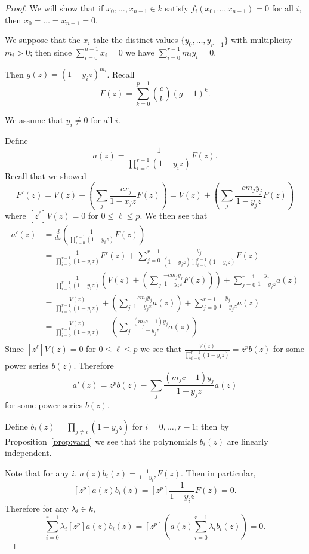 \documentclass{amsart}
\numberwithin{equation}{section}
\theoremstyle{definition}
\begin{document}
\begin{proof} 

We will show that if $x_0,\dots,x_{n-1} \in k$ satisfy $f_i(x_0,\dots,x_{n-1})=0$ for all $i$, then $x_0=\dots=x_{n-1}=0$. 



We suppose that the $x_i$ take the distinct values $\{y_0,\dots,y_{r-1}\}$ with multiplicity $m_i>0$; then since $\sum_{i=0}^{n-1} x_i=0$ we have $\sum_{i=0}^{r-1} m_iy_i=0$. 

Then $g(z)=(1-y_iz)^{m_i}$. Recall $$F(z)=\sum_{k=0}^{p-1} \binom{c}{k}(g-1)^k.$$

We assume that $y_i \ne 0$ for all $i$.

Define $$a(z)=\frac{1}{\prod_{i=0}^{r-1}(1-y_iz)}F(z).$$ Recall that we showed $$F'(z)=V(z)+\left(\sum_j \frac{-cx_j}{1-x_jz}F(z)\right)=V(z)+\left(\sum_j \frac{-cm_jy_j}{1-y_jz}F(z)\right)$$ where $[z^\ell]V(z)=0$ for $0 \le \ell \le p$. We then see that
\begin{align*}
a'(z)&=\frac{d}{dz}\left(\frac{1}{\prod_{i=0}^{r-1}(1-y_iz)}F(z)\right)\\
&=\frac{1}{\prod_{i=0}^{r-1}(1-y_iz)}F'(z)+\sum_{j=0}^{r-1}\frac{y_j}{(1-y_jz)\prod_{i=0}^{r-1}(1-y_iz)}F(z)\\
&=\frac{1}{\prod_{i=0}^{r-1}(1-y_iz)}\left(V(z)+\left(\sum_j \frac{-cm_jy_j}{1-y_jz}F(z)\right)\right)+\sum_{j=0}^{r-1}\frac{y_j}{1-y_jz}a(z)\\
&=\frac{V(z)}{\prod_{i=0}^{r-1}(1-y_iz)}+\left(\sum_j \frac{-cm_jy_j}{1-y_jz}a(z)\right)+\sum_{j=0}^{r-1}\frac{y_j}{1-y_jz}a(z)\\
&=\frac{V(z)}{\prod_{i=0}^{r-1}(1-y_iz)}-\left(\sum_j \frac{(m_jc-1)y_j}{1-y_jz}a(z)\right)\\\end{align*}
Since $[z^\ell]V(z)=0$ for $0 \le \ell \le p$ we see that $\frac{V(z)}{\prod_{i=0}^{r-1}(1-y_iz)}=z^pb(z)$ for some power series $b(z)$. Therefore $$a'(z)=z^pb(z)-\sum_j \frac{(m_jc-1)y_j}{1-y_jz}a(z)$$ for some power series $b(z)$.

Define $b_i(z)=\prod_{j \ne i} (1-y_jz)$ for $i=0,\dots,r-1$; then by Proposition~\ref{prop:vand} we see that the polynomials $b_i(z)$ are linearly independent. 

Note that for any $i$, $a(z)b_i(z)=\frac{1}{1-y_iz}F(z)$. Then in particular, $$[z^p]a(z)b_i(z)=[z^p]\frac{1}{1-y_iz}F(z)=0.$$ Therefore for any $\lambda_i \in k$, \begin{equation}\label{eq:lincomb}\sum_{i=0}^{r-1} \lambda_i[z^p]a(z)b_i(z)=[z^p]\left( a(z)\sum_{i=0}^{r-1}\lambda_ib_i(z)\right)=0.\end{equation}


\end{proof}
\end{document}
